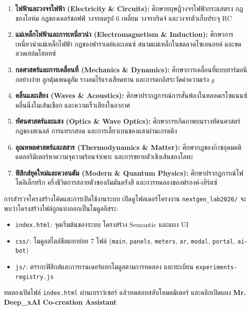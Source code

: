 \begin{enumerate}[leftmargin=1.5em, itemsep=3pt]
    \item \textbf{ไฟฟ้าและวงจรไฟฟ้า (Electricity \& Circuits):} ศึกษาทฤษฎีวงจรไฟฟ้ากระแสตรง กฎของโอห์ม กฎของเคอร์ชอฟฟ์ วงจรลดรูป 6 เหลี่ยม วงจรบริดจ์ และวงจรตัวเก็บประจุ RC
    \item \textbf{แม่เหล็กไฟฟ้าและการเหนี่ยวนำ (Electromagnetism \& Induction):} ศึกษาการเหนี่ยวนำแม่เหล็กไฟฟ้า กฎของฟาราเดย์และเลนซ์ สนามแม่เหล็กในขดลวดโซเลนอยด์ และขดลวดเฮล์มโฮลทซ์
    \item \textbf{กลศาสตร์และการเคลื่อนที่ (Mechanics \& Dynamics):} ศึกษาการเคลื่อนที่แบบฮาร์มอนิกอย่างง่าย ลูกตุ้มเพนดูลัม รางลมไร้แรงเสียดทาน และการตกอิสระวัดค่าความเร่ง $g$
    \item \textbf{คลื่นและเสียง (Waves \& Acoustics):} ศึกษาปรากฏการณ์การสั่นพ้องในหลอดเรโซแนนซ์ คลื่นนิ่งในเส้นเชือก และความเร็วเสียงในอากาศ
    \item \textbf{ทัศนศาสตร์และแสง (Optics \& Wave Optics):} ศึกษาการเกิดภาพบนรางทัศนศาสตร์ กฎของสเนลล์ การแทรกสอด และการเลี้ยวเบนของแสงผ่านเกรตติง
    \item \textbf{อุณหพลศาสตร์และสสาร (Thermodynamics \& Matter):} ศึกษากฎของก๊าซอุดมคติ แคลอริมิเตอร์หาความจุความร้อนจำเพาะ และการขยายตัวเชิงเส้นของโลหะ
    \item \textbf{ฟิสิกส์ยุคใหม่และควอนตัม (Modern \& Quantum Physics):} ศึกษาปรากฏการณ์โฟโตอิเล็กทริก ครึ่งชีวิตการสลายตัวของกัมมันตรังสี และการทดลองของฟรองค์-เฮิร์ตซ์
\end{enumerate}

\begin{activitybox}{การสำรวจโครงสร้างโค้ดและการเปิดใช้งานระบบ}
เปิดดูโฟลเดอร์โครงงาน \texttt{nextgen\_lab2026/} จะพบว่าโครงสร้างไฟล์ถูกแบ่งออกเป็นโมดูลอิสระ:
\begin{itemize}[leftmargin=1.5em, itemsep=2pt]
    \item \texttt{index.html}: จุดเริ่มต้นของระบบ โครงสร้าง Semantic และแผง UI
    \item \texttt{css/}: โมดูลสไตล์ชีตแยกย่อย 7 ไฟล์ (\texttt{main}, \texttt{panels}, \texttt{meters}, \texttt{ar}, \texttt{modal}, \texttt{portal}, \texttt{ai-bot})
    \item \texttt{js/}: ตรรกะฟิสิกส์และการเรนเดอร์แยกโมดูลตามการทดลอง และทะเบียน \texttt{experiments-registry.js}
\end{itemize}
ทดลองเปิดไฟล์ \texttt{index.html} ผ่านเบราว์เซอร์ แล้วทดสอบสลับโหมดมิเตอร์ และคลิกเปิดแผง \textbf{Mr. Deep\_xAI Co-creation Assistant}
\end{activitybox}

